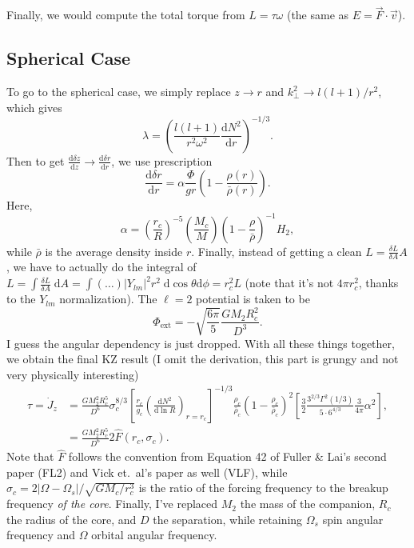 \documentclass[11pt,
        usenames, %
        dvipsnames %
    ]{article}
\newcommand*{\rd}[2]{\frac{\mathrm{d}#1}{\mathrm{d}#2}}
\newcommand*{\abs}[1]{\left|#1\right|}
\newcommand*{\p}[1]{\left(#1\right)}
\newcommand*{\s}[1]{\left[#1\right]}
\begin{document}
Finally, we would compute the total torque from $L = \tau \omega$ (the same
as $E = \vec{F} \cdot \vec{v}$).

\subsection{Spherical Case}

To go to the spherical case, we simply replace $z \to r$ and $k_\perp^2 \to l(l
+ 1)/r^2$, which gives
\begin{equation}
    \lambda = \p{\frac{l(l + 1)}{r^2\omega^2} \rd{N^2}{r}}^{-1/3}.
\end{equation}
Then to get $\rd{\delta z}{z} \to \rd{\delta r}{r}$, we use prescription
\begin{equation}
    \rd{\delta r}{r} = \alpha \frac{\Phi}{gr}
        \p{1 - \frac{\rho(r)}{\bar{\rho}(r)}}.
\end{equation}
Here,
\begin{equation}
    \alpha = \p{\frac{r_c}{R}}^{-5}\p{\frac{M_c}{M}}\p{1 -
        \frac{\rho}{\bar{\rho}}}^{-1}H_2,
\end{equation}
while $\bar{\rho}$ is the average density inside $r$. Finally, instead of
getting a clean $L = \frac{\delta L}{\delta A}A$, we have to actually do the
integral of $L = \int \frac{\delta L}{\delta A}\;\mathrm{d}A = \int (\dots)
\abs{Y_{lm}}^2 r^2 \;\mathrm{d}\cos\theta \mathrm{d}\phi = r_c^2 L$ (note that
it's not $4\pi r_c^2$, thanks to the $Y_{lm}$ normalization). The $\ell = 2$
potential is taken to be
\begin{equation}
    \Phi_{\mathrm{ext}} = -\sqrt{\frac{6\pi}{5}}\frac{GM_2R_c^2}{D^3}.
\end{equation}
I guess the angular dependency is just dropped. With all these things together,
we obtain the final KZ result (I omit the derivation, this part is grungy and
not very physically interesting)
\begin{align}
    \tau = \dot{J}_z &= \frac{GM_2^2R_c^5}{D^6} \sigma_c^{8/3}
        \s{\frac{r_c}{g_c}\p{\rd{N^2}{\ln R}}_{r = r_c}}^{-1/3}
            \frac{\rho_c}{\bar{\rho}_c} \p{1 - \frac{\rho_c}{\bar{\rho}_c}}^2
            \s{\frac{3}{2}\frac{3^{2/3}\Gamma^2(1/3)}{5 \cdot
                6^{4/3}} \frac{3}{4\pi}\alpha^2},\\
        &= \frac{GM_2^2R_c^5}{D^6}2\hat{F}\p{r_c, \sigma_c}.
            \label{eq:tau_fhat}
\end{align}
Note that $\hat{F}$ follows the convention from Equation 42 of Fuller \& Lai's
second paper (FL2) and Vick et.\ al's paper as well (VLF), while $\sigma_c =
2\abs{\Omega - \Omega_s} / \sqrt{GM_c / r_c^3}$ is the ratio of the forcing
frequency to the breakup frequency \emph{of the core}. Finally, I've replaced
$M_2$ the mass of the companion, $R_c$ the radius of the core, and $D$ the
separation, while retaining $\Omega_s$ spin angular frequency and $\Omega$
orbital angular frequency.
\end{document}
